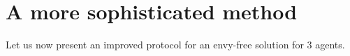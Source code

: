 \section{A more sophisticated method}

Let us now present an improved protocol for an envy-free solution for $3$ agents.



